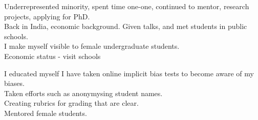 \documentclass[10pt]{article}
\begin{document}
Underrepresented minority, spent time one-one, continued to mentor, research projects, applying for PhD.\\

Back in India, economic background. Given talks, and met students in public schools.\\

I make myself visible to female undergraduate students.\\

Economic status - visit schools 

I educated myself 
I have taken online implicit bias tests to become aware of my biases.\\
 Taken efforts such as anonymysing student names.\\
 Creating rubrics for grading that are clear.\\

 Mentored female students.\\
\end{document}
